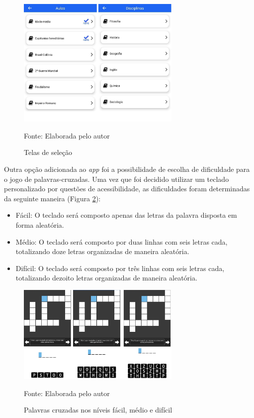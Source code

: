 \begin{figure}[H]
\centering
    \caption{Telas de seleção}
    \label{fig:telas-selecao}
    \includegraphics[width=0.7\textwidth]{Figuras/telas-selecao.jpg}
    
    Fonte: Elaborada pelo autor
\end{figure}

Outra opção adicionada ao \textit{app} foi a possibilidade de escolha de dificuldade para o jogo de palavras-cruzadas. Uma vez que foi decidido utilizar um teclado personalizado por questões de acessibilidade, as dificuldades foram determinadas da seguinte maneira (Figura \ref{fig:dificuldades}):
\begin{itemize}
    \item Fácil: O teclado será composto apenas das letras da palavra disposta em forma aleatória.
    
    \item Médio: O teclado será composto por duas linhas com seis letras cada, totalizando doze letras organizadas de maneira aleatória.
    
    \item Difícil: O teclado será composto por três linhas com seis letras cada, totalizando dezoito letras organizadas de maneira aleatória.
\end{itemize}

\begin{figure}[H]
\centering
    \caption{Palavras cruzadas nos níveis fácil, médio e difícil}
    \label{fig:dificuldades}
    \includegraphics[width=0.7\textwidth]{Figuras/dificuldades.jpg}
    
    Fonte: Elaborada pelo autor
\end{figure}

